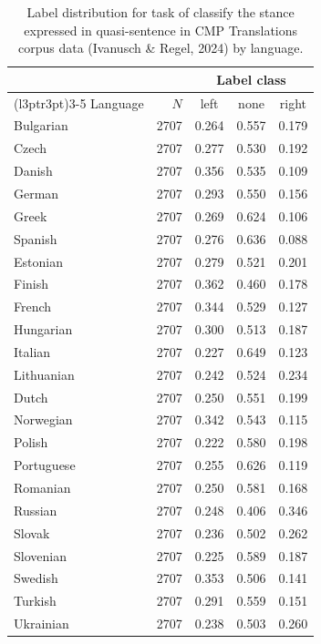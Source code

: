 \begin{table}[!t]

\caption{\label{tab:label_distribution_by_lang_cmp_translations_sample_rile}Label distribution for task of classify the stance expressed in quasi-sentence in CMP Translations corpus data (Ivanusch \& Regel, 2024) by language.}
\centering
\fontsize{10}{12}\selectfont
\begin{tabular}[t]{lrccc}
\toprule
\multicolumn{2}{c}{ } & \multicolumn{3}{c}{Label class} \\
\cmidrule(l{3pt}r{3pt}){3-5}
Language & $N$ & left & none & right\\
\midrule
Bulgarian & 2707 & 0.264 & 0.557 & 0.179\\
Czech & 2707 & 0.277 & 0.530 & 0.192\\
Danish & 2707 & 0.356 & 0.535 & 0.109\\
German & 2707 & 0.293 & 0.550 & 0.156\\
Greek & 2707 & 0.269 & 0.624 & 0.106\\
Spanish & 2707 & 0.276 & 0.636 & 0.088\\
Estonian & 2707 & 0.279 & 0.521 & 0.201\\
Finish & 2707 & 0.362 & 0.460 & 0.178\\
French & 2707 & 0.344 & 0.529 & 0.127\\
Hungarian & 2707 & 0.300 & 0.513 & 0.187\\
Italian & 2707 & 0.227 & 0.649 & 0.123\\
Lithuanian & 2707 & 0.242 & 0.524 & 0.234\\
Dutch & 2707 & 0.250 & 0.551 & 0.199\\
Norwegian & 2707 & 0.342 & 0.543 & 0.115\\
Polish & 2707 & 0.222 & 0.580 & 0.198\\
Portuguese & 2707 & 0.255 & 0.626 & 0.119\\
Romanian & 2707 & 0.250 & 0.581 & 0.168\\
Russian & 2707 & 0.248 & 0.406 & 0.346\\
Slovak & 2707 & 0.236 & 0.502 & 0.262\\
Slovenian & 2707 & 0.225 & 0.589 & 0.187\\
Swedish & 2707 & 0.353 & 0.506 & 0.141\\
Turkish & 2707 & 0.291 & 0.559 & 0.151\\
Ukrainian & 2707 & 0.238 & 0.503 & 0.260\\
\bottomrule
\end{tabular}
\end{table}
